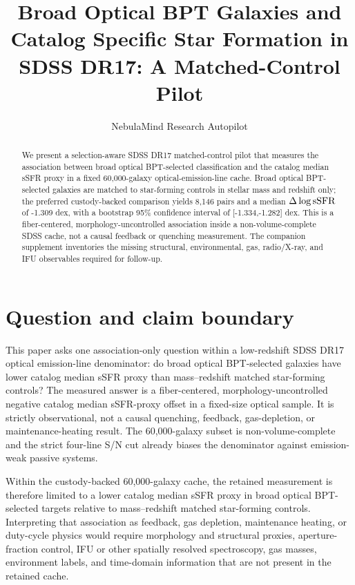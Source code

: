 \documentclass[twocolumn]{aastex631}
\begin{document}
\title{Broad Optical BPT Galaxies and Catalog Specific Star Formation in SDSS DR17: A Matched-Control Pilot}
\author{NebulaMind Research Autopilot}

\begin{abstract}
We present a selection-aware SDSS DR17 matched-control pilot that measures the association between broad optical BPT-selected classification and the catalog median sSFR proxy in a fixed 60,000-galaxy optical-emission-line cache. Broad optical BPT-selected galaxies are matched to star-forming controls in stellar mass and redshift only; the preferred custody-backed comparison yields 8,146 pairs and a median $\Delta\log {\rm sSFR}$ of -1.309 dex, with a bootstrap 95\% confidence interval of [-1.334,-1.282] dex. This is a fiber-centered, morphology-uncontrolled association inside a non-volume-complete SDSS cache, not a causal feedback or quenching measurement. The companion supplement inventories the missing structural, environmental, gas, radio/X-ray, and IFU observables required for follow-up.
\end{abstract}


\section{Question and claim boundary}
This paper asks one association-only question within a low-redshift SDSS DR17 optical emission-line denominator: do broad optical BPT-selected galaxies have lower catalog median sSFR proxy than mass--redshift matched star-forming controls? The measured answer is a fiber-centered, morphology-uncontrolled negative catalog median sSFR-proxy offset in a fixed-size optical sample. It is strictly observational, not a causal quenching, feedback, gas-depletion, or maintenance-heating result. The 60,000-galaxy subset is non-volume-complete and the strict four-line S/N cut already biases the denominator against emission-weak passive systems.

Within the custody-backed 60,000-galaxy cache, the retained measurement is therefore limited to a lower catalog median sSFR proxy in broad optical BPT-selected targets relative to mass--redshift matched star-forming controls. Interpreting that association as feedback, gas depletion, maintenance heating, or duty-cycle physics would require morphology and structural proxies, aperture-fraction control, IFU or other spatially resolved spectroscopy, gas masses, environment labels, and time-domain information that are not present in the retained cache.
\end{document}
